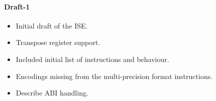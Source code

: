 
\paragraph{Draft-1}
\begin{itemize}
\item Initial draft of the ISE.
\item Transpose register support.
\item Included initial list of instructions and behaviour.
\item Encodings missing from the multi-precision format instructions.
\item Describe ABI handling.
\end{itemize}

